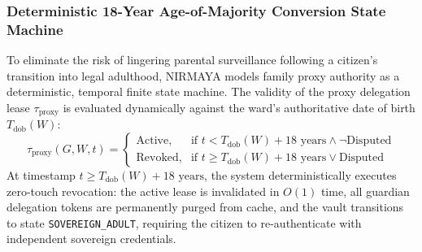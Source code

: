 \documentclass[journal,twocolumn]{IEEEtran}
\begin{document}
\subsubsection{Deterministic 18-Year Age-of-Majority Conversion State Machine}
To eliminate the risk of lingering parental surveillance following a citizen's transition into legal adulthood, NIRMAYA models family proxy authority as a deterministic, temporal finite state machine. The validity of the proxy delegation lease $\tau_{\text{proxy}}$ is evaluated dynamically against the ward's authoritative date of birth $T_{\text{dob}}(W)$:
\begin{equation}
    \label{eq:age_majority}
    \tau_{\text{proxy}}(G, W, t) = \begin{cases} 
        \text{Active}, & \text{if } t < T_{\text{dob}}(W) + 18\text{ years} \land \neg \text{Disputed} \\ 
        \text{Revoked}, & \text{if } t \ge T_{\text{dob}}(W) + 18\text{ years} \lor \text{Disputed} 
    \end{cases}
\end{equation}
At timestamp $t \ge T_{\text{dob}}(W) + 18\text{ years}$, the system deterministically executes zero-touch revocation: the active lease is invalidated in $O(1)$ time, all guardian delegation tokens are permanently purged from cache, and the vault transitions to state \texttt{SOVEREIGN\_ADULT}, requiring the citizen to re-authenticate with independent sovereign credentials.
\end{document}
